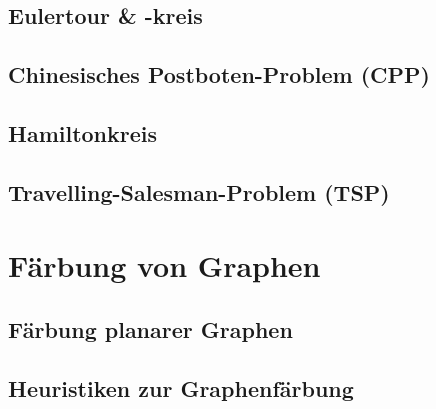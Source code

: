 \documentclass[10pt,a4paper,landscape]{article}
\begin{document}
\begin{multicols*}{3}
            \subsection{ Eulertour \& -kreis}

            \subsection{ Chinesisches Postboten-Problem (CPP) }

            \subsection{ Hamiltonkreis }

            \subsection{ Travelling-Salesman-Problem (TSP) }


        \section{ Färbung von Graphen }
            \subsection{ Färbung planarer Graphen }

            \subsection{ Heuristiken zur Graphenfärbung }


    \end{multicols*}
\end{document}
